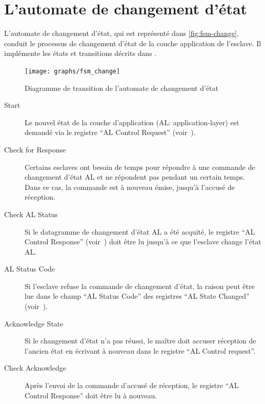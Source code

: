 \documentclass[a4paper,12pt,BCOR6mm,bibtotoc,idxtotoc]{scrbook}
\begin{document}

\section{L'automate de changement d'\'etat}
\label{sec:fsm-change}

L'automate de changement d'\'etat, qui est repr\'esent\'e dans
\autoref{fig:fsm-change}, conduit le processus de changement d'\'etat de
la couche application de l'esclave. Il impl\'emente les \'etats et
transitions d\'ecrits dans \cite[sec.~6.4.1]{alspec}.

\begin{figure}[htbp]
  \centering
  \texttt{[image: graphs/fsm\_change]}
  \caption{Diagramme de transition de l'automate de changement d'\'etat}
  \label{fig:fsm-change}
\end{figure}

\begin{description}

\item[Start] Le nouvel \'etat de la couche d'application (AL:
  application-layer) est demand\'e via le registre ``AL Control
  Request'' (voir~\cite[sec. 5.3.1]{alspec}).

\item[Check for Response] Certains esclaves ont besoin de temps pour
  r\'epondre \`a une commande de changement d'\'etat AL et ne
  r\'epondent pas pendant un certain temps. Dans ce cas, la commande
  est \`a nouveau \'emise, jusqu'\`a l'accus\'e de r\'eception.

\item[Check AL Status] Si le datagramme de changement d'\'etat AL a
  \'et\'e acquit\'e, le registre ``AL Control Response''
  (voir~\cite[sec. 5.3.2]{alspec}) doit \^etre lu jusqu'\`a ce que
  l'esclave change l'\'etat AL.

\item[AL Status Code] Si l'esclave refuse la commande de changement
  d'\'etat, la raison peut \^etre lue dans le champ ``AL Status Code''
  des registres ``AL State Changed'' (voir~\cite[sec. 5.3.3]{alspec}).

\item[Acknowledge State] Si le changement d'\'etat n'a pas r\'eussi,
  le ma\^itre doit accuser r\'eception de l'ancien \'etat en
  \'ecrivant \`a nouveau dans le registre ``AL Control request''.


\item[Check Acknowledge] Apr\`es l'envoi de la commande d'accus\'e de
  r\'eception, le registre ``AL Control Response'' doit \^etre lu \`a
  nouveau.

\end{description}
\end{document}
